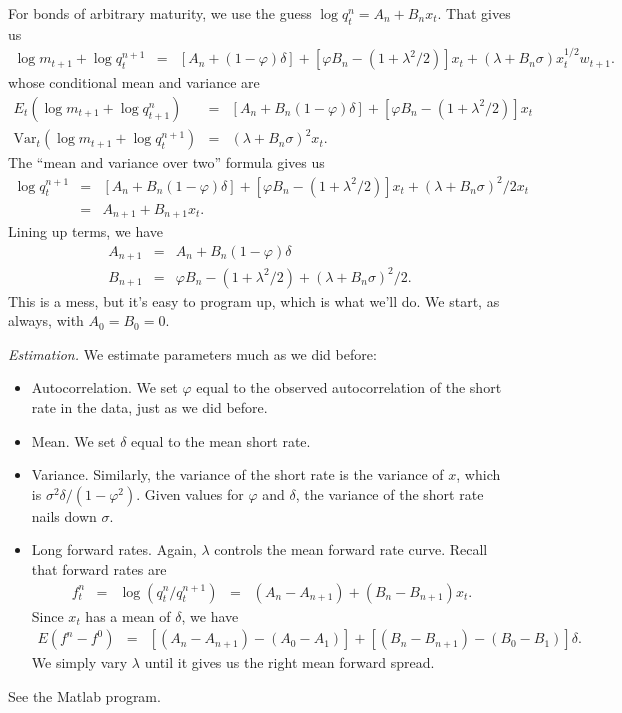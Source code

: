 \documentclass[11pt]{article}
\begin{document}
For bonds of arbitrary maturity,
we use the guess  $ \log q^n_t = A_n + B_n x_t$.
That gives us
\begin{eqnarray*}
    \log m_{t+1} + \log q^{n+1}_t &=&
            [A_n + (1-\varphi) \delta] + [\varphi B_n -(1+\lambda^2/2)] x_t
                    + (\lambda + B_n \sigma) x_t^{1/2} w_{t+1} .
\end{eqnarray*}
whose conditional mean and variance are
\begin{eqnarray*}
   E_t \left( \log m_{t+1} + \log q^{n}_{t+1} \right) &=&
            [A_n + B_n (1-\varphi) \delta] + [\varphi B_n -(1+\lambda^2/2)] x_t \\
   \mbox{Var}_t \left( \log m_{t+1} + \log q^{n+1}_t \right) &=&
            (\lambda + B_n \sigma)^2 x_t .
\end{eqnarray*}
The ``mean and variance over two'' formula gives us
\begin{eqnarray*}
    \log q^{n+1}_t &=&
            [A_n + B_n (1-\varphi) \delta] + [\varphi B_n -(1+\lambda^2/2)] x_t
                    + (\lambda + B_n \sigma)^2/2  x_t  \\
                &=& A_{n+1} + B_{n+1} x_t.
\end{eqnarray*}
Lining up terms, we have
\begin{eqnarray*}
    A_{n+1} &=& A_n + B_n (1-\varphi) \delta \\
    B_{n+1} &=& \varphi B_n -(1+\lambda^2/2) + (\lambda + B_n \sigma)^2/2 .
\end{eqnarray*}
This is a mess, but it's easy to program up, which is what we'll do.
We start, as always, with $A_0 = B_0 = 0$.

{\it Estimation.\/}
We estimate parameters much as we did before:
%
\begin{itemize}
\item Autocorrelation.
We set $\varphi$ equal to the observed autocorrelation of the short rate in the data,
just as we did before.

\item Mean.  We set $\delta$ equal to the mean short rate.

\item Variance.  Similarly, the variance of the short rate is the variance of $x$,
which is $ \sigma^2 \delta/(1-\varphi^2)$.
Given values for $\varphi$ and $\delta$,
the variance of the short rate nails down $\sigma$.

\item Long forward rates.  Again,
$\lambda$ controls the mean forward rate curve.
Recall that forward rates are
\begin{eqnarray*}
    f^n_t &=& \log (q^n_t/q^{n+1}_t)
                \;\;=\;\;  (A_n - A_{n+1}) + (B_n - B_{n+1}) x_t .
\end{eqnarray*}
Since $x_t$ has a  mean of $\delta$,  we have
\begin{eqnarray*}
    E (f^n - f^0) &=&  [(A_n - A_{n+1}) - (A_0 - A_{1})] +
        [(B_n - B_{n+1}) - (B_0 - B_{1})] \delta.
\end{eqnarray*}
We simply vary $\lambda$ until it gives us the right mean forward spread.

\end{itemize}
See the Matlab program.
\end{document}
